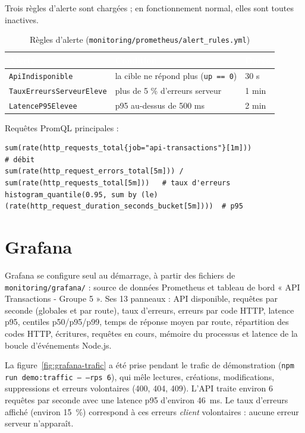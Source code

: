 
Trois règles d'alerte sont chargées ; en fonctionnement normal, elles sont toutes inactives.

\begin{table}[H]
\centering\small
\caption{Règles d'alerte (\texttt{monitoring/prometheus/alert\_rules.yml})}
\begin{tabularx}{\linewidth}{|l|X|l|}
\hline
\rowcolor{bluedark}\textcolor{white}{\textbf{Alerte}} & \textcolor{white}{\textbf{Condition}} & \textcolor{white}{\textbf{Durée}} \\
\hline
\texttt{ApiIndisponible} & la cible ne répond plus (\texttt{up == 0}) & 30 s \\
\hline
\texttt{TauxErreursServeurEleve} & plus de 5 \% d'erreurs serveur & 1 min \\
\hline
\texttt{LatenceP95Elevee} & p95 au-dessus de 500 ms & 2 min \\
\hline
\end{tabularx}
\end{table}


Requêtes PromQL principales :
\begin{lstlisting}
sum(rate(http_requests_total{job="api-transactions"}[1m]))                     # débit
sum(rate(http_request_errors_total[5m])) / sum(rate(http_requests_total[5m]))   # taux d'erreurs
histogram_quantile(0.95, sum by (le) (rate(http_request_duration_seconds_bucket[5m])))  # p95
\end{lstlisting}

\section{Grafana}
Grafana se configure seul au démarrage, à partir des fichiers de \texttt{monitoring/grafana/} :
source de données Prometheus et tableau de bord « API Transactions - Groupe 5 ». Ses 13 panneaux :
API disponible, requêtes par seconde (globales et par route), taux d'erreurs, erreurs par code HTTP,
latence p95, centiles p50/p95/p99, temps de réponse moyen par route, répartition des codes HTTP,
écritures, requêtes en cours, mémoire du processus et latence de la boucle d'événements Node.js.

La figure~\ref{fig:grafana-trafic} a été prise pendant le trafic de démonstration
(\texttt{npm run demo:traffic -- --rps 6}), qui mêle lectures, créations, modifications,
suppressions et erreurs volontaires (400, 404, 409). L'API traite environ 6 requêtes par seconde
avec une latence p95 d'environ 46~ms. Le taux d'erreurs affiché (environ 15~\%) correspond à ces
erreurs \emph{client} volontaires : aucune erreur serveur n'apparaît.

